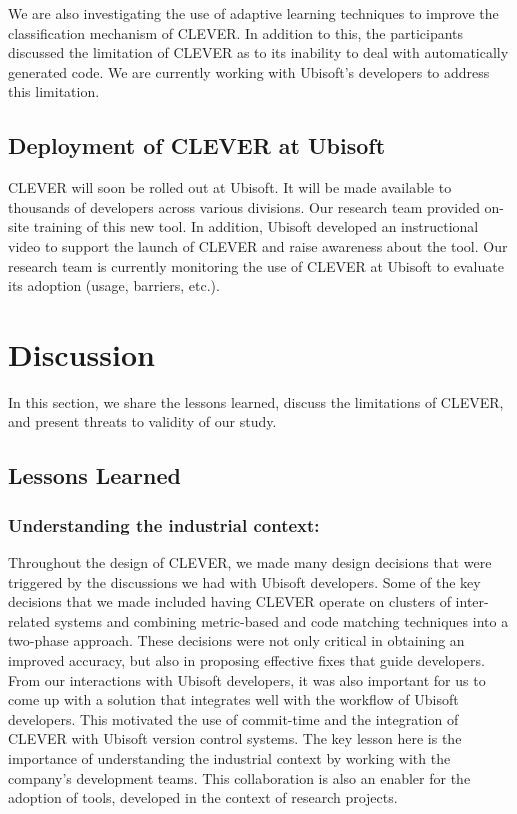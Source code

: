 \documentclass[sigconf]{acmart}
\begin{document}
We are also investigating the use of adaptive learning techniques to
improve the classification mechanism of CLEVER. In addition to this, the
participants discussed the limitation of CLEVER as to its inability to
deal with automatically generated code. We are currently working with
Ubisoft's developers to address this limitation.

\subsection{Deployment of CLEVER at
Ubisoft}\label{deployment-of-clever-at-ubisoft}

CLEVER will soon be rolled out at Ubisoft. It will be made available to
thousands of developers across various divisions. Our research team
provided on-site training of this new tool. In addition, Ubisoft
developed an instructional video to support the launch of CLEVER and
raise awareness about the tool. Our research team is currently
monitoring the use of CLEVER at Ubisoft to evaluate its adoption (usage,
barriers, etc.).

\section{Discussion}\label{sec:threats}

In this section, we share the lessons learned, discuss the limitations
of CLEVER, and present threats to validity of our study.

\subsection{Lessons Learned}\label{lessons-learned}

\subsubsection{Understanding the industrial
context:}\label{understanding-the-industrial-context}

Throughout the design of CLEVER, we made many design decisions that were
triggered by the discussions we had with Ubisoft developers. Some of the
key decisions that we made included having CLEVER operate on clusters of
inter-related systems and combining metric-based and code matching
techniques into a two-phase approach. These decisions were not only
critical in obtaining an improved accuracy, but also in proposing
effective fixes that guide developers. From our interactions with
Ubisoft developers, it was also important for us to come up with a
solution that integrates well with the workflow of Ubisoft developers.
This motivated the use of commit-time and the integration of CLEVER with
Ubisoft version control systems. The key lesson here is the importance
of understanding the industrial context by working with the company's
development teams. This collaboration is also an enabler for the
adoption of tools, developed in the context of research projects.
\end{document}
